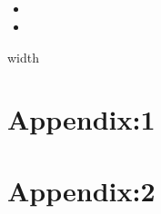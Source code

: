 \documentclass[12pt]{article}  %
\begin{document}
\subsection{}  %
  \begin{itemize}  %
  	\item 
  	\item 
  \end{itemize}
   


\clearpage   %
\begin{thebibliography}{99}
	
\end{thebibliography}


%  





\leaders\vrule width \linewidth\vskip 2pt %


	
\newpage
\appendix
\section{Appendix:1}


\section{Appendix:2}












   
   
\end{document}
